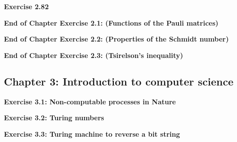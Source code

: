 \documentclass{article}
\begin{document}
\bigskip

\begin{framed}
    \noindent \textbf{Exercise 2.82}
    
    \medskip
    
    
\end{framed}

\bigskip

\begin{framed}
    \noindent \textbf{End of Chapter Exercise 2.1: (Functions of the Pauli matrices)}
    
    \medskip
    
    
\end{framed}

\bigskip

\begin{framed}
    \noindent \textbf{End of Chapter Exercise 2.2: (Properties of the Schmidt number)}
    
    \medskip
    
    
\end{framed}

\bigskip

\begin{framed}
    \noindent \textbf{End of Chapter Exercise 2.3: (Tsirelson’s inequality)}
    
    \medskip
    
    
\end{framed}

\subsection*{Chapter 3: Introduction to computer science}

\bigskip

\begin{framed}
    \noindent \textbf{Exercise 3.1: Non-computable processes in Nature}
    
    \medskip
    
    
\end{framed}

\bigskip

\begin{framed}
    \noindent \textbf{Exercise 3.2: Turing numbers}
    
    \medskip
    
    
\end{framed}

\bigskip

\begin{framed}
    \noindent \textbf{Exercise 3.3: Turing machine to reverse a bit string}
    
    \medskip
    
    
\end{framed}
\end{document}
